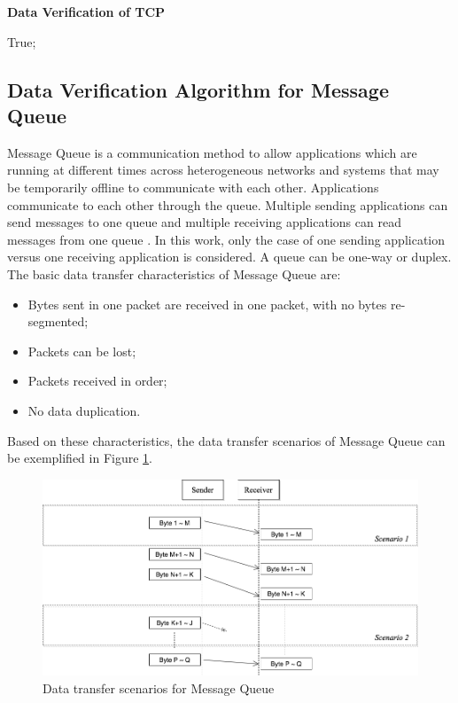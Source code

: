 \begin{algorithm}[H]
\DontPrintSemicolon
\caption{{\bf Data Verification of TCP} \label{dataAlg2}}
\;
 \KwRet True;\;
\end{algorithm} 


\subsection{Data Verification Algorithm for Message Queue}
Message Queue is a communication method to allow applications which are running at different times across heterogeneous networks and systems that may be temporarily offline to communicate with each other. Applications communicate to each other through the queue. Multiple sending applications can send messages to one queue and multiple receiving applications can read messages from one queue \cite{redkar2004pro}. In this work, only the case of one sending application versus one receiving application is considered. A queue can be one-way or duplex. The basic data transfer characteristics of Message Queue are:
\begin{itemize}
  \item Bytes sent in one packet are received in one packet, with no bytes re-segmented;
  \item Packets can be lost;
  \item Packets received in order;
  \item No data duplication.
\end{itemize}
Based on these characteristics, the data transfer scenarios of Message Queue can be exemplified in Figure \ref{msmq}.
\begin{figure}[H]
\centerline{\includegraphics[scale=0.4]{Figures/msmq}}
\caption{Data transfer scenarios for Message Queue}
\label{msmq}
\end{figure}

